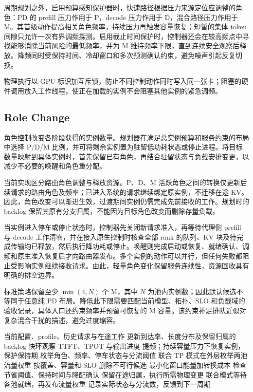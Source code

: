 \documentclass[11pt,a4paper,twocolumn]{article}
\begin{document}
周期规划之外，启用预算感知保护器时，快速路径根据压力来源定位应调整的角色：PD 的 prefill 压力作用于 P，decode 压力作用于 D，混合路径压力作用于 M。其首级动作提高相关角色频率，持续压力再触发容量恢复；短暂的集体 token 间隙只允许一次有界调频探测。启用截止时间保护时，控制器还会在较高频点中寻找能够消除当前风险的最低频率，并为 M 维持频率下限，直到连续安全观察后释放。降频同时受保持时间、冷却窗口和多次预测确认约束，避免噪声引起反复切换。

物理执行以 GPU 标识加互斥锁，防止不同控制动作同时写入同一张卡；阻塞的硬件调用放入工作线程，使正在加载的实例不会阻塞其他实例的紧急调频。

\subsection{Role Change}
角色控制改变各阶段获得的实例数量。规划器在满足总实例预算和服务约束的布局中选择 P/D/M 比例，并可将剩余实例置为驻留低功耗状态或停止进程。将目标数量映射到具体实例时，首先保留已有角色，再结合驻留状态与负载安排变更，以减少不必要的唤醒和角色重分配。

当前实现区分路由角色调整与释放资源。P、D、M 活跃角色之间的转换仅更新后续请求的路由角色及频率；已进入系统的请求继续绑定原实例，不迁移在途 KV。因此，角色改变可以渐进生效，过渡期间实例仍需完成先前接收的工作。规划时的 backlog 保留其原有分支归属，不能因为目标角色改变而删除存量负载。

当实例进入停车或停止状态时，控制器先关闭新请求准入，再等待代理侧 prefill 与 decode 工作清零，并在接入原生控制时核查全部 rank 的队列、KV 块及待完成传输均已释放，然后执行降功耗或停止。唤醒则完成启动或恢复、就绪确认、调频和原生准入恢复后才向路由器发布。多个实例的动作可以并行，但任何失败都阻止受影响实例继续接收请求。由此，轻量角色变化保留服务连续性，资源回收具有明确的排空边界。

标准策略保留至少 $\min(4,N)$ 个 M，其中 $N$ 为池内实例数；因此默认候选不等同于任意纯 PD 布局。降低此下限需要匹配当前模型、拓扑、SLO 和负载域的验收记录，具体入口还约束频率并预留可恢复的 M 容量。该约束补足排队近似对复杂混合干扰的描述，避免过度缩容。

\begin{algorithm}[t]
\caption{自适应池配置的控制流程}
\label{alg:adapt}
\small
\begin{algorithmic}[1]
\Require 当前配置、profile、历史请求与在途工作
\State 更新到达率、长度分布及保留归属的 backlog
\State 快环观察 TTFT、TPOT 与输出进度
  \State 提频；持续容量压力下恢复实例，保护保持期
\EndIf
{}
  \State 枚举角色、频率、停车状态与分流阈值
  \State 联合 TP 模式在外层枚举两池流量权重
  \State 按覆盖、容量和 SLO 删除不可行候选
  \State 最小化窗口能量加转换成本
  \State 检查节省阈值、保持时间与降配确认
  \State 保留在途归属，执行所需物理变更
  \State 联合模式等待各池就绪，再发布流量权重
\EndIf
\State 记录实际状态与分流数，反馈到下一周期
\end{algorithmic}
\end{algorithm}
\end{document}
